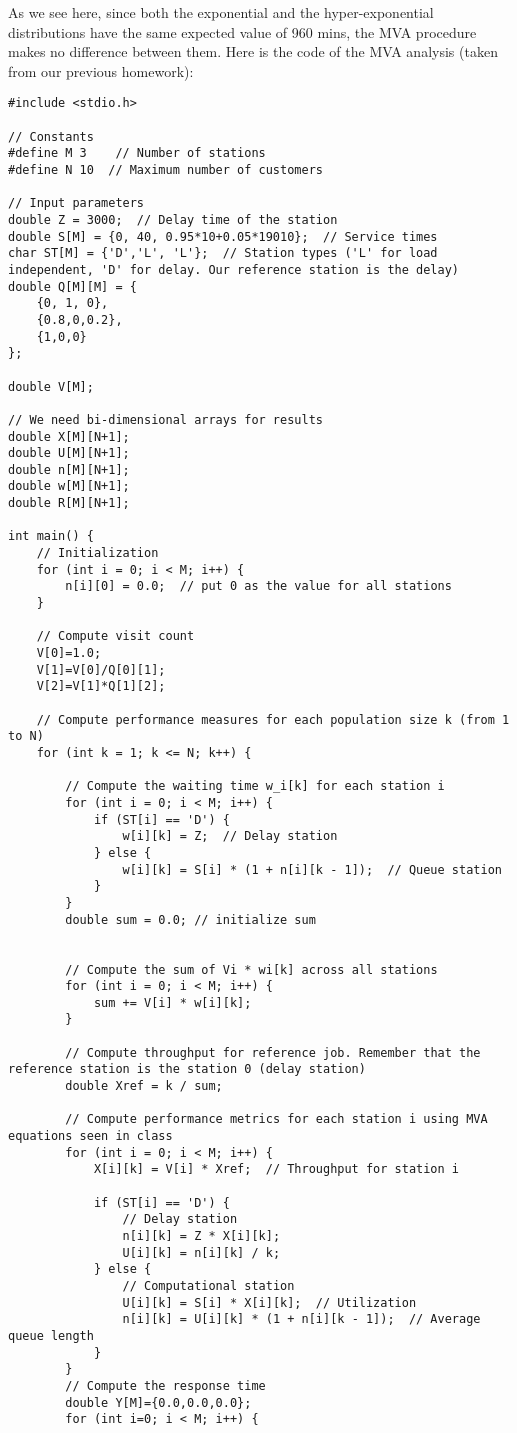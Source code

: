 \documentclass[12pt]{article}
\begin{document}
As we see here, since both the exponential and the hyper-exponential distributions have the same expected value of 960 mins, the MVA procedure makes no difference between them. Here is the code of the MVA analysis (taken from our previous homework):
\begin{lstlisting}
#include <stdio.h>

// Constants
#define M 3    // Number of stations
#define N 10  // Maximum number of customers

// Input parameters
double Z = 3000;  // Delay time of the station
double S[M] = {0, 40, 0.95*10+0.05*19010};  // Service times
char ST[M] = {'D','L', 'L'};  // Station types ('L' for load independent, 'D' for delay. Our reference station is the delay)
double Q[M][M] = {
	{0, 1, 0},
	{0.8,0,0.2},
	{1,0,0}
};

double V[M];

// We need bi-dimensional arrays for results
double X[M][N+1];
double U[M][N+1]; 
double n[M][N+1];
double w[M][N+1];
double R[M][N+1];

int main() {
	// Initialization
	for (int i = 0; i < M; i++) {
		n[i][0] = 0.0;  // put 0 as the value for all stations
	}
	
	// Compute visit count
	V[0]=1.0;
	V[1]=V[0]/Q[0][1];
	V[2]=V[1]*Q[1][2];
	
	// Compute performance measures for each population size k (from 1 to N)
	for (int k = 1; k <= N; k++) {
		
		// Compute the waiting time w_i[k] for each station i
		for (int i = 0; i < M; i++) {
			if (ST[i] == 'D') {
				w[i][k] = Z;  // Delay station
			} else {
				w[i][k] = S[i] * (1 + n[i][k - 1]);  // Queue station
			}
		}
		double sum = 0.0; // initialize sum
		
		
		// Compute the sum of Vi * wi[k] across all stations
		for (int i = 0; i < M; i++) {
			sum += V[i] * w[i][k];
		}
		
		// Compute throughput for reference job. Remember that the reference station is the station 0 (delay station)
		double Xref = k / sum;
		
		// Compute performance metrics for each station i using MVA equations seen in class
		for (int i = 0; i < M; i++) {
			X[i][k] = V[i] * Xref;  // Throughput for station i
			
			if (ST[i] == 'D') {
				// Delay station
				n[i][k] = Z * X[i][k];
				U[i][k] = n[i][k] / k;
			} else {
				// Computational station
				U[i][k] = S[i] * X[i][k];  // Utilization
				n[i][k] = U[i][k] * (1 + n[i][k - 1]);  // Average queue length
			}
		}
		// Compute the response time
		double Y[M]={0.0,0.0,0.0};
		for (int i=0; i < M; i++) {
			

\end{lstlisting}
\end{document}
